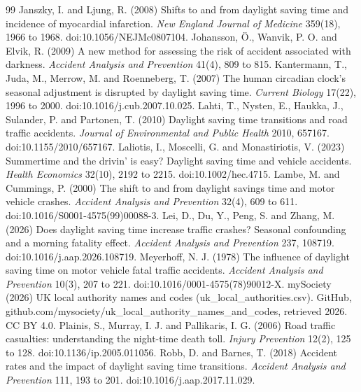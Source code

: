 \documentclass[11pt,a4paper]{article}
\begin{document}
\begin{thebibliography}{99}
 Janszky, I. and Ljung, R. (2008) Shifts to and from daylight saving time and incidence of myocardial infarction. \textit{New England Journal of Medicine} 359(18), 1966 to 1968. doi:10.1056/NEJMc0807104.
 Johansson, \"O., Wanvik, P. O. and Elvik, R. (2009) A new method for assessing the risk of accident associated with darkness. \textit{Accident Analysis and Prevention} 41(4), 809 to 815.
 Kantermann, T., Juda, M., Merrow, M. and Roenneberg, T. (2007) The human circadian clock's seasonal adjustment is disrupted by daylight saving time. \textit{Current Biology} 17(22), 1996 to 2000. doi:10.1016/j.cub.2007.10.025.
 Lahti, T., Nysten, E., Haukka, J., Sulander, P. and Partonen, T. (2010) Daylight saving time transitions and road traffic accidents. \textit{Journal of Environmental and Public Health} 2010, 657167. doi:10.1155/2010/657167.
 Laliotis, I., Moscelli, G. and Monastiriotis, V. (2023) Summertime and the drivin' is easy? Daylight saving time and vehicle accidents. \textit{Health Economics} 32(10), 2192 to 2215. doi:10.1002/hec.4715.
 Lambe, M. and Cummings, P. (2000) The shift to and from daylight savings time and motor vehicle crashes. \textit{Accident Analysis and Prevention} 32(4), 609 to 611. doi:10.1016/S0001-4575(99)00088-3.
 Lei, D., Du, Y., Peng, S. and Zhang, M. (2026) Does daylight saving time increase traffic crashes? Seasonal confounding and a morning fatality effect. \textit{Accident Analysis and Prevention} 237, 108719. doi:10.1016/j.aap.2026.108719.
 Meyerhoff, N. J. (1978) The influence of daylight saving time on motor vehicle fatal traffic accidents. \textit{Accident Analysis and Prevention} 10(3), 207 to 221. doi:10.1016/0001-4575(78)90012-X.
 mySociety (2026) UK local authority names and codes (uk\_local\_authorities.csv). GitHub, github.com/mysociety/uk\_local\_authority\_names\_and\_codes, retrieved 2026. CC BY 4.0.
 Plainis, S., Murray, I. J. and Pallikaris, I. G. (2006) Road traffic casualties: understanding the night-time death toll. \textit{Injury Prevention} 12(2), 125 to 128. doi:10.1136/ip.2005.011056.
 Robb, D. and Barnes, T. (2018) Accident rates and the impact of daylight saving time transitions. \textit{Accident Analysis and Prevention} 111, 193 to 201. doi:10.1016/j.aap.2017.11.029.

\end{thebibliography}
\end{document}
